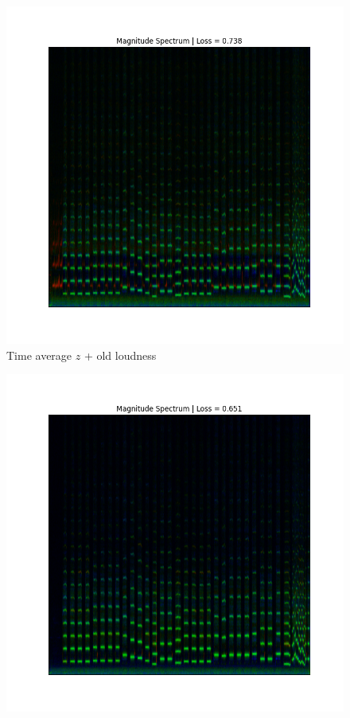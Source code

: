 \begin{figure}
    \centering
    \begin{minipage}[b]{0.45\textwidth}
        \centering
        \includegraphics[width=\textwidth]{figures/loudness/reconstruction_baseline.png}
        \small Time average $z$ + old loudness
    \end{minipage}
    \hfill
    \begin{minipage}[b]{0.45\textwidth}
        \centering
        \includegraphics[width=\textwidth]{figures/loudness/reconstruction_new_loudness.png}

\end{minipage}
\end{figure}
